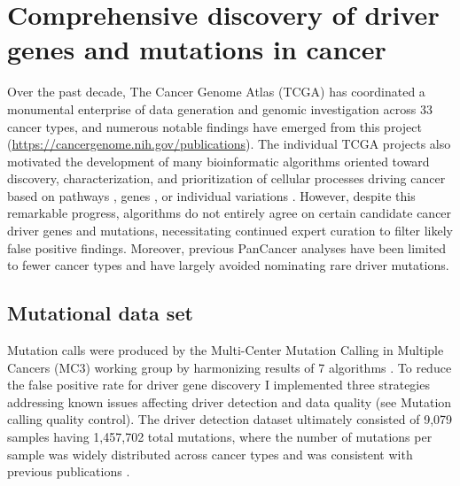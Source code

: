 
\chapter{Comprehensive discovery of driver genes and mutations in cancer}
\label{chap:ch7}

Over the past decade, The Cancer Genome Atlas (TCGA) has coordinated a monumental enterprise of data generation and genomic investigation across 33 cancer types, and numerous notable findings have emerged from this project (\url{https://cancergenome.nih.gov/publications}). The individual TCGA projects also motivated the development of many bioinformatic algorithms oriented toward discovery, characterization, and prioritization of cellular processes driving cancer based on pathways \cite{RN180}, genes \cite{RN49}, or individual variations \cite{RN181}. However, despite this remarkable progress, algorithms do not entirely agree on certain candidate cancer driver genes and mutations, necessitating continued expert curation to filter likely false positive findings. Moreover, previous PanCancer analyses \cite{RN96} have been limited to fewer cancer types and have largely avoided nominating rare driver mutations. 

\section{Mutational data set}
Mutation calls were produced by the Multi-Center Mutation Calling in Multiple Cancers (MC3) working group by harmonizing results of 7 algorithms \cite{RN167}. To reduce the false positive rate for driver gene discovery I implemented three strategies addressing known issues affecting driver detection and data quality (see Mutation calling quality control). The driver detection dataset ultimately consisted of 9,079 samples having 1,457,702 total mutations, where the number of mutations per sample was widely distributed across cancer types and was consistent with previous publications \cite{RN12, RN13, RN96}.

